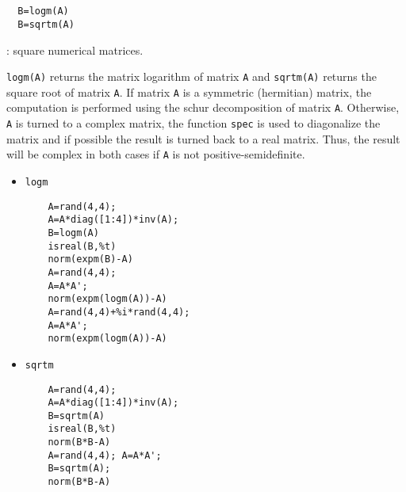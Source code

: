 \begin{mandesc}
   \\ %
   \\ %
\end{mandesc}
\begin{calling_sequence}
\begin{verbatim}
  B=logm(A)  
  B=sqrtm(A)  
\end{verbatim}
\end{calling_sequence}
\begin{parameters}
  \begin{varlist}
    : square numerical matrices.
  \end{varlist}
\end{parameters}
\begin{mandescription}
  \verb!logm(A)! returns the matrix logarithm of matrix \verb!A! and 
  \verb!sqrtm(A)! returns the square root of matrix \verb!A!. 
  If matrix \verb!A! is a symmetric (hermitian) matrix, the 
  computation is performed using the schur decomposition of matrix \verb!A!.
  Otherwise, \verb!A! is turned to a complex matrix, the function 
  \verb!spec! is used to diagonalize the matrix and if possible 
  the result is turned back to a real matrix. Thus, the result will be 
  complex in both cases  if \verb!A! is not positive-semidefinite.
\end{mandescription}
\begin{examples}
\begin{itemize}
  \item \verb!logm!
  \begin{Verbatim}
    A=rand(4,4); 
    A=A*diag([1:4])*inv(A);
    B=logm(A)
    isreal(B,%t)
    norm(expm(B)-A)
    A=rand(4,4);
    A=A*A';
    norm(expm(logm(A))-A)
    A=rand(4,4)+%i*rand(4,4);
    A=A*A';
    norm(expm(logm(A))-A)
  \end{Verbatim}
  \item \verb!sqrtm!
  \begin{Verbatim}
    A=rand(4,4); 
    A=A*diag([1:4])*inv(A);
    B=sqrtm(A)
    isreal(B,%t)
    norm(B*B-A)
    A=rand(4,4); A=A*A';
    B=sqrtm(A);
    norm(B*B-A)
  \end{Verbatim}
\end{itemize}
\end{examples}
\begin{manseealso}
       
\end{manseealso}
